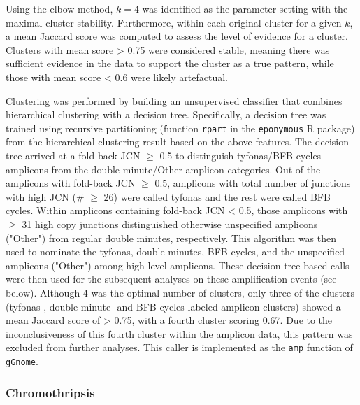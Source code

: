 \documentclass[phd,tocprelim]{cornell}
\newcommand{\ttt}[1]{\texttt{#1}}
\begin{document}
Using the elbow method, $k=4$ was identified as the parameter setting with the maximal cluster stability.  Furthermore, within each original cluster for a given $k$, a mean Jaccard score was computed to assess the level of evidence for a cluster. Clusters with mean score > 0.75 were considered stable, meaning there was sufficient evidence in the data to support the cluster as a true pattern, while those with mean score < 0.6 were likely artefactual.

Clustering was performed by building an unsupervised classifier that combines hierarchical clustering with a decision tree.  Specifically, a decision tree was trained using recursive partitioning (function \texttt{rpart} in the \texttt{eponymous} R package) from the hierarchical clustering result based on the above features. The decision tree arrived at a fold back JCN $\ge$ 0.5 to distinguish tyfonas/BFB cycles amplicons from the double minute/Other amplicon categories. Out of the amplicons with fold-back JCN $\geq$ 0.5, amplicons with total number of junctions with high JCN (\# $\geq$ 26) were called tyfonas and the rest were called BFB cycles. Within amplicons containing fold-back JCN < 0.5, those amplicons with $\geq$ 31 high copy junctions distinguished otherwise unspecified amplicons ("Other") from regular double minutes, respectively. This algorithm was then used to nominate the tyfonas, double minutes, BFB cycles, and the unspecified amplicons ("Other") among high level amplicons. These decision tree-based calls were then used for the subsequent analyses on these amplification events (see below). Although 4 was the optimal number of clusters, only three of the clusters (tyfonas-, double minute- and BFB cycles-labeled amplicon clusters) showed a mean Jaccard score of > 0.75, with a fourth cluster scoring 0.67. Due to the inconclusiveness of this fourth cluster within the amplicon data, this pattern was excluded from further analyses. This caller is implemented as the \ttt{amp} function of \ttt{gGnome}.



\subsubsection*{Chromothripsis}
\end{document}
